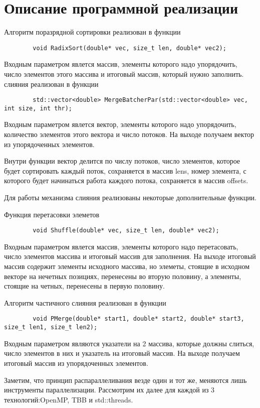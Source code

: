 \documentclass{report}
\begin{document}
	\section*{Описание программной реализации}
	Алгоритм поразрядной сортировки реализован в функции
	\begin{lstlisting}
		void RadixSort(double* vec, size_t len, double* vec2);
	\end{lstlisting}
	\par Входным параметром явлется массив, элементы которого надо упорядочить, число элементов этого массива и итоговый массив, который нужно заполнить.
	 слияния реализован в функции
	\begin{lstlisting}
		std::vector<double> MergeBatcherPar(std::vector<double> vec, int size, int thr);
	\end{lstlisting}
	\par Входным параметром явлется вектор, элементы которого надо упорядочить, количество элементов этого вектора и число потоков. На выходе получаем вектор из упорядоченных элементов.
	\par Внутри функции вектор делится по числу потоков, число элементов, которое будет сортировать каждый поток, сохраняется в массив lens, номер элемента, с которого будет начинаться работа каждого потока, сохраняется в массив offsets. 
	\par Для работы механизма слияния реализованы некоторые дополнительные функции.
	\par Функция перетасовки элеметов
	\begin{lstlisting}
		void Shuffle(double* vec, size_t len, double* vec2);
	\end{lstlisting}
	\par Входным параметром явлется массив, элементы которого надо перетасовать, число элементов массива и итоговый массив для заполнения. На выходе итоговый массив содержит элементы исходного массива, но элеметы, стоящие в исходном векторе на нечетных позициях, перенесены во вторую половину, а элементы, стоящие на четных, перенесены в первую половину.
	\par Алгоритм частичного слияния реализован в функции
	\begin{lstlisting}
		void PMerge(double* start1, double* start2, double* start3, size_t len1, size_t len2);
	\end{lstlisting}
	\par Входным параметром являются указатели на 2 массива, которые должны слиться, число элементов в них и указатель на итоговый массив. На выходе получаем итоговый массив из упорядоченных элементов.
	\par Заметим, что принцип распараллеливания везде один и тот же, меняются лишь инструменты параллелизации. Рассмотрим их далее для каждой из 3 технологий:OpenMP, TBB и std::threads.
	\newpage
	
\end{document}
